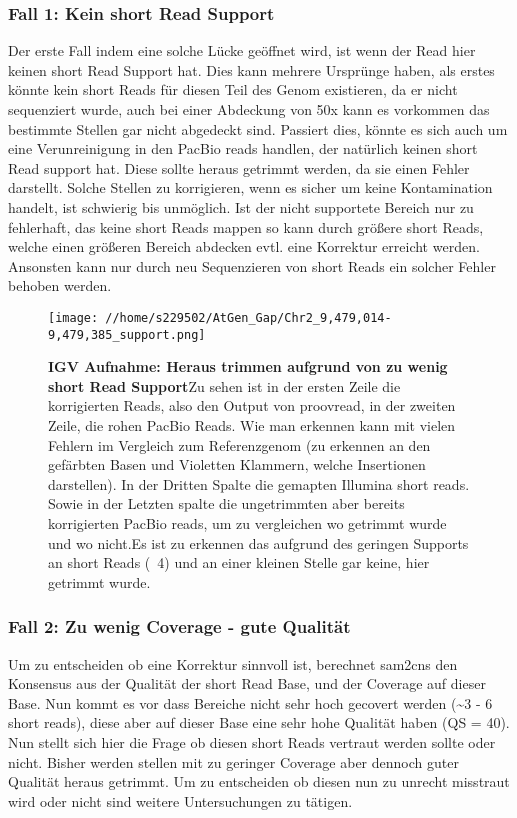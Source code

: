 \documentclass{scrartcl}
\begin{document}
\subsubsection{Fall 1: Kein short Read Support}
\label{sec-7-4-1}
Der erste Fall indem eine solche Lücke geöffnet wird, ist wenn der Read hier keinen short Read Support hat. Dies kann mehrere Ursprünge haben, als erstes
könnte kein short Reads für diesen Teil des Genom existieren, da er nicht sequenziert wurde, auch bei einer Abdeckung von 50x kann es vorkommen das bestimmte 
Stellen gar nicht abgedeckt sind. Passiert dies, könnte es sich auch um eine Verunreinigung 
in den PacBio reads handlen, der natürlich keinen short Read support hat. Diese sollte heraus getrimmt werden, da sie einen Fehler darstellt. 
Solche Stellen zu korrigieren, wenn es sicher um  keine Kontamination handelt, ist schwierig bis unmöglich. Ist der nicht supportete Bereich nur zu fehlerhaft, das keine short Reads
mappen so kann durch größere short Reads, welche einen größeren Bereich abdecken evtl. eine Korrektur erreicht werden. Ansonsten kann nur durch neu Sequenzieren
von short Reads ein solcher Fehler behoben werden.
\begin{figure}
\texttt{[image: //home/s229502/AtGen\_Gap/Chr2\_9,479,014-9,479,385\_support.png]}
\caption[IGV Aufnahme: Heraus trimmen aufgrund von zu wenig short Read Support]{\textbf{IGV Aufnahme: Heraus trimmen aufgrund von zu wenig short Read Support}Zu sehen ist in der ersten Zeile die korrigierten Reads, also den Output von proovread, in der zweiten Zeile, die rohen PacBio Reads. Wie man erkennen kann mit vielen Fehlern im Vergleich zum Referenzgenom (zu erkennen an den gefärbten Basen und Violetten Klammern, welche Insertionen darstellen). In der Dritten Spalte die gemapten Illumina short reads. Sowie in der Letzten spalte die ungetrimmten aber bereits korrigierten PacBio reads, um zu vergleichen wo getrimmt wurde  und wo nicht.Es ist zu erkennen das aufgrund des geringen Supports an short Reads (~4) und an einer kleinen Stelle gar keine, hier getrimmt wurde. }
\end{figure}

\subsubsection{Fall 2: Zu wenig Coverage - gute Qualität}
\label{sec-7-4-2}
Um zu entscheiden ob eine Korrektur sinnvoll ist, berechnet sam2cns den Konsensus aus der Qualität der short Read Base, und der Coverage auf dieser Base.
Nun kommt es vor dass Bereiche nicht sehr hoch gecovert werden (\textasciitilde{}3 - 6 short reads), diese aber auf dieser Base eine sehr hohe Qualität haben (QS = 40). 
Nun stellt sich hier die Frage ob diesen short Reads vertraut werden sollte oder nicht. Bisher werden stellen mit zu geringer Coverage aber dennoch guter 
Qualität heraus getrimmt. Um zu entscheiden ob diesen nun zu unrecht misstraut wird oder nicht sind weitere Untersuchungen zu tätigen.
\end{document}
